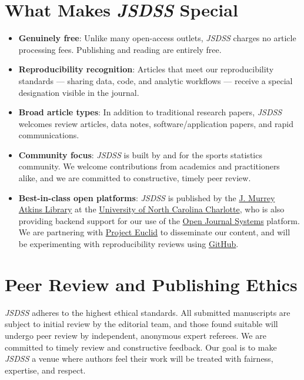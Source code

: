 \documentclass[
  12pt]{article}
\providecommand{\tightlist}{%
  \setlength{\itemsep}{0pt}\setlength{\parskip}{0pt}}
\begin{document}
\section{\texorpdfstring{What Makes \emph{JSDSS}
Special}{What Makes JSDSS Special}}\label{what-makes-jsdss-special}

\begin{itemize}
\tightlist
\item
  \textbf{Genuinely free}: Unlike many open-access outlets, \emph{JSDSS}
  charges no article processing fees. Publishing and reading are
  entirely free.
\item
  \textbf{Reproducibility recognition}: Articles that meet our
  reproducibility standards --- sharing data, code, and analytic
  workflows --- receive a special designation visible in the journal.
\item
  \textbf{Broad article types}: In addition to traditional research
  papers, \emph{JSDSS} welcomes review articles, data notes,
  software/application papers, and rapid communications.
\item
  \textbf{Community focus}: \emph{JSDSS} is built by and for the sports
  statistics community. We welcome contributions from academics and
  practitioners alike, and we are committed to constructive, timely peer
  review.
\item
  \textbf{Best-in-class open platforms}: \emph{JSDSS} is published by
  the \href{https://library.charlotte.edu/}{J. Murrey Atkins Library} at
  the \href{https://www.charlotte.edu/}{University of North Carolina
  Charlotte}, who is also providing backend support for our use of the
  \href{https://pkp.sfu.ca/software/ojs/}{Open Journal Systems}
  platform. We are partnering with
  \href{https://projecteuclid.org/}{Project Euclid} to disseminate our
  content, and will be experimenting with reproducibility reviews using
  \href{https://github.com/jsds-sports}{GitHub}.
\end{itemize}

\section{Peer Review and Publishing
Ethics}\label{peer-review-and-publishing-ethics}

\emph{JSDSS} adheres to the highest ethical standards. All submitted
manuscripts are subject to initial review by the editorial team, and
those found suitable will undergo peer review by independent, anonymous
expert referees. We are committed to timely review and constructive
feedback. Our goal is to make \emph{JSDSS} a venue where authors feel
their work will be treated with fairness, expertise, and respect.
\end{document}

